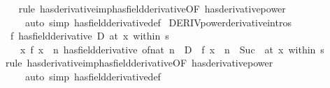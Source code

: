 \begin{isabellebody}
%
\isadelimproof
\ \ %
\endisadelimproof
%
\isatagproof
{}\isamarkupfalse%
\ {\isacharparenleft}{\kern0pt}rule\ has{\isacharunderscore}{\kern0pt}derivative{\isacharunderscore}{\kern0pt}imp{\isacharunderscore}{\kern0pt}has{\isacharunderscore}{\kern0pt}field{\isacharunderscore}{\kern0pt}derivative{\isacharbrackleft}{\kern0pt}OF\ has{\isacharunderscore}{\kern0pt}derivative{\isacharunderscore}{\kern0pt}power{\isacharbrackright}{\kern0pt}{\isacharparenright}{\kern0pt}\isanewline
\ \ \ \ \ {\isacharparenleft}{\kern0pt}auto\ simp{\isacharcolon}{\kern0pt}\ has{\isacharunderscore}{\kern0pt}field{\isacharunderscore}{\kern0pt}derivative{\isacharunderscore}{\kern0pt}def{\isacharparenright}{\kern0pt}%
\endisatagproof
{\isafoldproof}%
%
\isadelimproof
\isanewline
%
\endisadelimproof
\isanewline
{}\isamarkupfalse%
\ DERIV{\isacharunderscore}{\kern0pt}power{\isacharbrackleft}{\kern0pt}derivative{\isacharunderscore}{\kern0pt}intros{\isacharbrackright}{\kern0pt}{\isacharcolon}{\kern0pt}\isanewline
\ \ {\isachardoublequoteopen}{\isacharparenleft}{\kern0pt}f\ has{\isacharunderscore}{\kern0pt}field{\isacharunderscore}{\kern0pt}derivative\ D{\isacharparenright}{\kern0pt}\ {\isacharparenleft}{\kern0pt}at\ x\ within\ s{\isacharparenright}{\kern0pt}\ {\isasymLongrightarrow}\isanewline
\ \ \ \ {\isacharparenleft}{\kern0pt}{\isacharparenleft}{\kern0pt}{\isasymlambda}x{\isachardot}{\kern0pt}\ f\ x\ {\isacharcircum}{\kern0pt}\ n{\isacharparenright}{\kern0pt}\ has{\isacharunderscore}{\kern0pt}field{\isacharunderscore}{\kern0pt}derivative\ of{\isacharunderscore}{\kern0pt}nat\ n\ {\isacharasterisk}{\kern0pt}\ {\isacharparenleft}{\kern0pt}D\ {\isacharasterisk}{\kern0pt}\ f\ x\ {\isacharcircum}{\kern0pt}\ {\isacharparenleft}{\kern0pt}n\ {\isacharminus}{\kern0pt}\ Suc\ {}{\isacharparenright}{\kern0pt}{\isacharparenright}{\kern0pt}{\isacharparenright}{\kern0pt}\ {\isacharparenleft}{\kern0pt}at\ x\ within\ s{\isacharparenright}{\kern0pt}{\isachardoublequoteclose}\isanewline
%
\isadelimproof
\ \ %
\endisadelimproof
%
\isatagproof
{}\isamarkupfalse%
\ {\isacharparenleft}{\kern0pt}rule\ has{\isacharunderscore}{\kern0pt}derivative{\isacharunderscore}{\kern0pt}imp{\isacharunderscore}{\kern0pt}has{\isacharunderscore}{\kern0pt}field{\isacharunderscore}{\kern0pt}derivative{\isacharbrackleft}{\kern0pt}OF\ has{\isacharunderscore}{\kern0pt}derivative{\isacharunderscore}{\kern0pt}power{\isacharbrackright}{\kern0pt}{\isacharparenright}{\kern0pt}\isanewline
\ \ \ \ \ {\isacharparenleft}{\kern0pt}auto\ simp{\isacharcolon}{\kern0pt}\ has{\isacharunderscore}{\kern0pt}field{\isacharunderscore}{\kern0pt}derivative{\isacharunderscore}{\kern0pt}def{\isacharparenright}{\kern0pt}%

\end{isabellebody}
